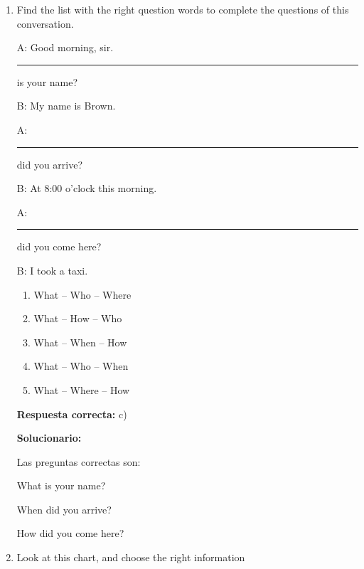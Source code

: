 \begin{enumerate}[resume]
	
	\item Find the list with the right question words to complete the questions of this conversation.
	
	A: Good morning, sir. \rule{1.5cm}{0.4pt} is your name?
	
	B: My name is Brown.
	
	A: \rule{1.5cm}{0.4pt} did you arrive?
	
	B: At 8:00 o'clock this morning.
	
	A: \rule{1.5cm}{0.4pt} did you come here?
	
	B: I took a taxi.
	
	\begin{enumerate}[label=\alph*)]
		\item What -- Who -- Where
		\item What -- How -- Who
		\item What -- When -- How
		\item What -- Who -- When
		\item What -- Where -- How
	\end{enumerate}
	\textbf{Respuesta correcta:} c)
	
	\vspace{2mm}
	\textbf{Solucionario:}
	
	Las preguntas correctas son:
	
	What is your name?
	
	When did you arrive?
	
	How did you come here?
	
	\vspace{6mm}
	
	\item Look at this chart, and choose the right information
	
\begin{center}
\end{center}
\end{enumerate}

